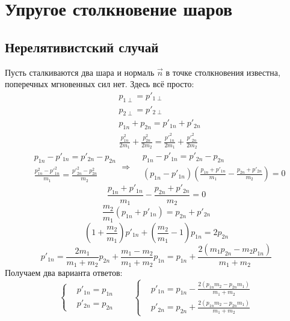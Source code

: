 \section{Упругое столкновение шаров}

\subsection{Нерелятивистский случай}

Пусть сталкиваются два шара и нормаль $\vec{n}$ в точке столкновения известна, поперечных мгновенных сил нет. Здесь всё просто:
\[
	\begin{aligned}
	& p_{1\perp} = p'_{1\perp} \\
	& p_{2\perp} = p'_{2\perp} \\
	& p_{1n} + p_{2n} = p'_{1n} + p'_{2n} \\
	& \frac{p_{1n}^2}{2m_1} + \frac{p_{2n}^2}{2m_2} = \frac{{p'}_{1n}^2}{2m_1} + \frac{{p'}_{2n}^2}{2m_2}
	\end{aligned} 
\]
\[
	\begin{aligned}
	& p_{1n} - p'_{1n} = p'_{2n} - p_{2n} \\
	& \frac{p_{1n}^2 - {p'}_{1n}^2}{m_1} = \frac{{p'}_{2n}^2 - p_{2n}^2}{m_2}
	\end{aligned}
	\Rightarrow
	\begin{aligned}
	& p_{1n} - p'_{1n} = p'_{2n} - p_{2n} \\
	& (p_{1n} - p'_{1n})\left(\frac{p_{1n} + p'_{1n}}{m_1} - \frac{p_{2n} + p'_{2n}}{m_2} \right) = 0
	\end{aligned}
\]
\[
	\frac{p_{1n} + p'_{1n}}{m_1} - \frac{p_{2n} + p'_{2n}}{m_2} = 0
\]
\[
	\frac{m_2}{m_1} (p_{1n} + p'_{1n}) = p_{2n} + p'_{2n}
\]
\[
	\left(1 + \frac{m_2}{m_1} \right) p'_{1n} + \left(\frac{m_2}{m_1} - 1\right) p_{1n} = 2 p_{2n}
\]
\[
	p'_{1n} = 
	\frac{2 m_1}{m_1 + m_2}  p_{2n} + \frac{m_1 - m_2}{m_1 + m_2} p_{1n} = 
	p_{1n} + \frac{2 (m_1 p_{2n} - m_2 p_{1n})}{m_1 + m_2} 
\]
Получаем два варианта ответов:
\[
	\left\{
	\begin{aligned}
	& p'_{1n} = p_{1n} \\
	& p'_{2n} = p_{2n}
	\end{aligned}
	\right.
	\qquad	
	\left\{
	\begin{aligned}
	& p'_{1n} = p_{1n} - \frac{2 (p_{1n} m_2 - p_{2n} m_1)}{m_1 + m_2} \\
	& p'_{2n} = p_{2n} + \frac{2 (p_{1n} m_2 - p_{2n} m_1)}{m_1 + m_2}
	\end{aligned}
	\right.
\]

